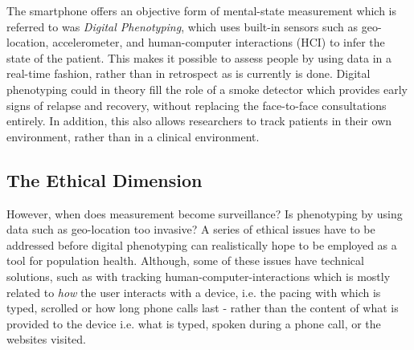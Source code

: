 The smartphone offers an objective form of mental-state measurement which is referred to was \textit{Digital Phenotyping}, which uses built-in sensors such as geo-location, accelerometer, and human-computer interactions (HCI) to infer the state of the patient. This makes it possible to assess people by using data in a real-time fashion, rather than in retrospect as is currently is done. Digital phenotyping could in theory fill the role of a smoke detector which provides early signs of relapse and recovery, without replacing the face-to-face consultations entirely. In addition, this also allows researchers to track patients in their own environment, rather than in a clinical environment.

\subsection{The Ethical Dimension}
However, when does measurement become surveillance? Is phenotyping by using data such as geo-location too invasive? A series of ethical issues have to be addressed before digital phenotyping can realistically hope to be employed as a tool for population health. Although, some of these issues have technical solutions, such as with tracking human-computer-interactions which is mostly related to \textit{how} the user interacts with a device, i.e. the pacing with which is typed, scrolled or how long phone calls last - rather than the content of what is provided to the device i.e. what is typed, spoken during a phone call, or the websites visited. 

